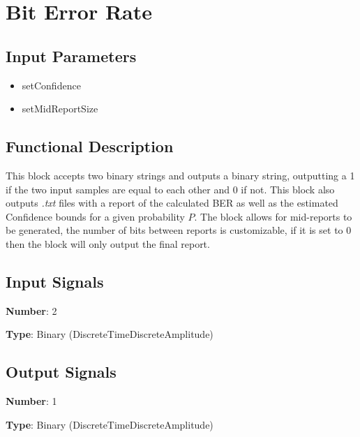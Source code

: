 \clearpage

\section{Bit Error Rate}

\subsection*{Input Parameters}

\begin{multicols}{2}
	\begin{itemize}
		\item setConfidence
		\item setMidReportSize
	\end{itemize}
\end{multicols}

\subsection*{Functional Description}

This block accepts two binary strings and outputs a binary string, outputting a 1 if the two input samples are equal to each other and 0 if not. This block also outputs \textit{.txt} files with a report of the calculated BER as well as the estimated Confidence bounds for a given probability $P$. The block allows for mid-reports to be generated, the number of bits between reports is customizable, if it is set to 0 then the block will only output the final report.

\subsection*{Input Signals}

\textbf{Number}: 2

\textbf{Type}: Binary (DiscreteTimeDiscreteAmplitude)

\subsection*{Output Signals}

\textbf{Number}: 1

\textbf{Type}: Binary (DiscreteTimeDiscreteAmplitude)
